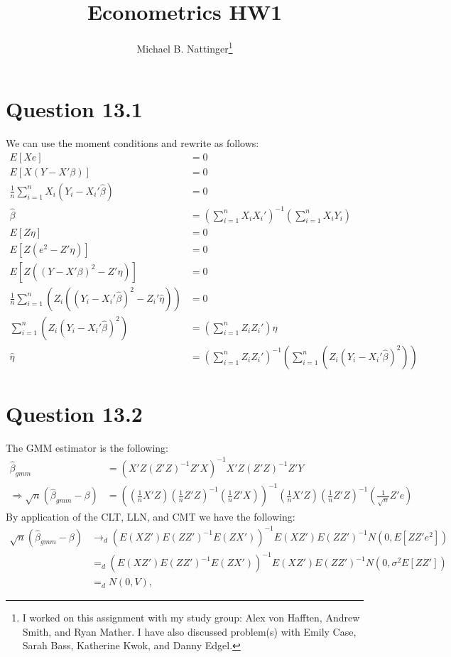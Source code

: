 \documentclass[11pt]{article} %
\title{Econometrics HW1}
\author{Michael B. Nattinger\footnote{I worked on this assignment with my study group: Alex von Hafften, Andrew Smith, and Ryan Mather. I have also discussed problem(s) with Emily Case, Sarah Bass, Katherine Kwok, and Danny Edgel.}}
\begin{document}
\maketitle

\section{Question 13.1}
We can use the moment conditions and rewrite as follows:
\begin{align*}
E[Xe] &= 0\\
E[X(Y-X'\beta)] &= 0\\
\frac{1}{n}\sum_{i=1}^nX_i(Y_i - X_i'\hat{\beta}) &= 0\\
\hat{\beta} &= \left( \sum_{i=1}^n X_i X_i'\right)^{-1}\left( \sum_{i=1}^n X_i Y_i\right)\\
E[Z\eta] &= 0\\
E[Z(e^2 - Z'\eta)] &= 0\\
E[Z((Y - X'\beta)^2 - Z'\eta)] &= 0\\
\frac{1}{n}\sum_{i=1}^n \left(Z_i((Y_i - X_i'\hat{\beta})^2 - Z_i'\hat{\eta}) \right) &= 0\\
\sum_{i=1}^n \left(Z_i(Y_i - X_i'\hat{\beta})^2\right) &=  \left(\sum_{i=1}^n Z_iZ_i' \right)\hat{\eta}\\
\hat{\eta} &= \left( \sum_{i=1}^n Z_iZ_i'  \right)^{-1}\left(\sum_{i=1}^n \left(Z_i(Y_i - X_i'\hat{\beta})^2\right) \right)
\end{align*}
\section{Question 13.2}
The GMM estimator is the following:
\begin{align*}
\hat{\beta}_{gmm} &= \left( X'Z(Z'Z)^{-1}Z'X\right)^{-1}X'Z(Z'Z)^{-1}Z'Y\\
\Rightarrow \sqrt{n} (\hat{\beta}_{gmm} - \beta) &= \left( \left(\frac{1}{n} X'Z\right)\left(\frac{1}{n}Z'Z\right)^{-1}\left(\frac{1}{n}Z'X\right)\right)^{-1}\left(\frac{1}{n}X'Z\right)\left(\frac{1}{n}Z'Z\right)^{-1}\left(\frac{1}{\sqrt{n}}Z'e\right)
\end{align*}
By application of the CLT, LLN, and CMT we have the following:
\begin{align*}
\sqrt{n} (\hat{\beta}_{gmm} - \beta) &\rightarrow_d \left( E\left( XZ'\right)E\left(ZZ'\right)^{-1}E\left(ZX'\right)\right)^{-1}E\left(XZ'\right)E\left(ZZ'\right)^{-1}N(0,E[ZZ'e^2]) \\
&=_d \left( E\left( XZ'\right)E\left(ZZ'\right)^{-1}E\left(ZX'\right)\right)^{-1}E\left(XZ'\right)E\left(ZZ'\right)^{-1}N(0,\sigma^2E[ZZ'])\\
&=_d N(0,V),
\end{align*}
\end{document}
